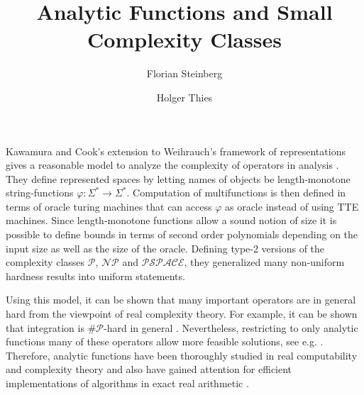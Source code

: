 \documentclass[a4paper,11pt]{article}
\author[1,2]{Florian Steinberg}
\author[1]{Holger Thies}
\title{Analytic Functions and Small Complexity Classes}
\affil[1]{The University of Tokyo}
\affil[2]{TU Darmstadt}
\date{}
\newcommand{\p}{\ensuremath{\mathcal P}\xspace}
\newcommand{\np}{\ensuremath{\mathcal{NP}}\xspace}
\newcommand{\sharpp}{\ensuremath{\# \mathcal{P}}\xspace}
\newcommand{\pspace}{\ensuremath{ \mathcal{PSPACE}}\xspace}
\begin{document}
\maketitle
\thispagestyle{empty}\pagestyle{empty}
Kawamura and Cook's extension to Weihrauch's framework of representations \cite{Weihrauch} gives a reasonable model to analyze the complexity of operators in analysis \cite{AkiACM}.
They define represented spaces by letting names of objects be length-monotone string-functions $\varphi: \Sigma^* \to \Sigma^*$. 
Computation of multifunctions is then defined in terms of oracle turing machines that can access $\varphi$ as oracle instead of using TTE machines.
Since length-monotone functions allow a sound notion of size it is possible to define bounds in terms of second order polynomials depending on the input size as well as the size of the oracle.
Defining type-2 versions of the complexity classes \p, \np and \pspace, they generalized many non-uniform hardness results into uniform statements.

Using this model, it can be shown that many important operators are in general hard from the viewpoint of real complexity theory. 
For example, it can be shown that integration is \sharpp-hard in general \cite{MR748898,AkiACM}.
Nevertheless, restricting to only analytic functions many of these operators allow more feasible solutions, see e.g. \cite{MR1137517, Kawamura2012}.  
Therefore, analytic functions have been thoroughly studied in real computability and complexity theory and also have gained attention for efficient implementations of algorithms in exact real arithmetic \cite{DBLP:journals/corr/abs-1006-0401}.
\end{document}
